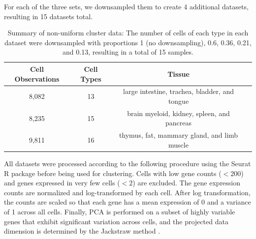 For each of the three sets, we downsampled them to create 4 additional datasets, resulting in 15 datasets total.
\begin{table}[tp]
	\centering
	\caption{Summary of non-uniform cluster data: The number of cells of each type in each dataset were downsampled with proportions 1 (no downsampling), 0.6, 0.36, 0.21, and 0.13, resulting in a total of 15 samples. }{
		\begin{tabular}{cccc}
			\hline
			\textbf{Cell Observations} & \textbf{Cell Types} & \textbf{Tissue}                               \\ \hline
			8,082                      & 13                  & large intestine, trachea, bladder, and tongue \\
			8,235                      & 15                  & brain myeloid, kidney, spleen, and pancreas   \\
			9,811                      & 16                  & thymus, fat, mammary gland, and limb muscle   \\ \hline
		\end{tabular}}
	\label{tab:datasets}
\end{table}
%

All datasets were processed according to the following procedure using the Seurat R package before being used for clustering.
Cells with low gene counts ($<200$) and genes expressed in very few cells ($<2$) are excluded.
The gene expression counts are normalized and log-transformed by each cell.
After log transformation, the counts are scaled so that each gene has a mean expression of 0 and a variance of 1 across all cells.
Finally, PCA is performed on a subset of highly variable genes that exhibit significant variation across cells, and the projected data dimension is determined by the Jackstraw method \citep{Chung_jackstraw}.


